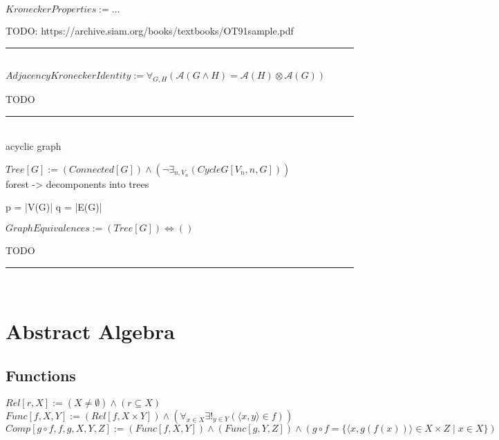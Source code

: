 \documentclass{book}
\newcommand{\abr}{:=}
\newcommand{\pr}[1]{\left(#1\right)}
\newcommand{\st}{\mathbin{|}}
\begin{document}
$KroneckerProperties \abr \ldots$
\begin{enumerate}
  \lit TODO: https://archive.siam.org/books/textbooks/OT91sample.pdf
\end{enumerate} \vspace{.75mm} \hrule \vspace{.75mm} \ \\

$AdjacencyKroneckerIdentity \abr \forall_{G, H}\pr{\mathcal{A}(G \land H) = \mathcal{A}(H) \otimes \mathcal{A}(G)}$
\begin{enumerate}
  \lit TODO
\end{enumerate} \vspace{.75mm} \hrule \vspace{.75mm} \ \\

acyclic graph

$Tree[G] \abr (Connected[G]) \land \pr{\lnot \exists_{n, V_n}(CycleG[V_n, n, G])}$ \\

forest  -> decomponents into trees

p = |V(G)|
q = |E(G)|



$GraphEquivalences \abr (Tree[G]) \iff ()$ \\
\begin{enumerate}
  \lit TODO
\end{enumerate} \vspace{.75mm} \hrule \vspace{.75mm} \ \\














\chapter{Abstract Algebra}
\section{Functions}
$Rel[r, X] \abr (X \neq \emptyset) \land (r \subseteq X)$ \\
$Func[f, X, Y] \abr (Rel[f, X \times Y]) \land \pr{\forall_{x \in X} \exists!_{y \in Y}(\langle x, y \rangle \in f)}$ \\
$Comp[g \circ f, f, g, X, Y, Z] \abr (Func[f, X, Y]) \land (Func[g, Y, Z]) \land \pr{g \circ f = \{\langle x, g\pr{f(x)} \rangle \in X \times Z \st x \in X\}}$ \\
\end{document}
